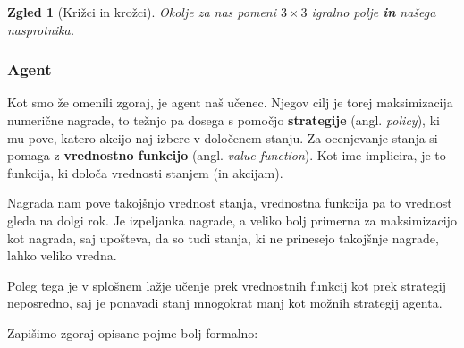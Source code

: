 \documentclass[12pt,a4paper]{amsart}
\theoremstyle{definition} %
\theoremstyle{plain} %
\newtheorem{zgled}[definicija]{Zgled}
\begin{document}
\begin{zgled}[Križci in krožci]
    Okolje za nas pomeni $3\times3$ igralno polje \textbf{in} našega nasprotnika.
\end{zgled}

\subsubsection{Agent}
Kot smo že omenili zgoraj, je agent naš učenec. Njegov cilj je torej maksimizacija numerične 
nagrade, to težnjo pa dosega s pomočjo \textbf{strategije} (angl. \textit{policy}), ki mu pove, 
katero akcijo naj izbere v določenem stanju. Za ocenjevanje stanja si pomaga z \textbf{vrednostno 
funkcijo} (angl. \textit{value function}). Kot ime implicira, je to funkcija, ki določa vrednosti 
stanjem (in akcijam). 

Nagrada nam pove takojšnjo vrednost stanja, vrednostna funkcija pa to vrednost gleda na dolgi
rok. Je izpeljanka nagrade, a veliko bolj primerna za maksimizacijo kot nagrada, saj upošteva,
da so tudi stanja, ki ne prinesejo takojšnje nagrade, lahko veliko vredna.

Poleg tega je v splošnem lažje učenje prek vrednostnih funkcij kot prek strategij neposredno, 
saj je ponavadi stanj mnogokrat manj kot možnih strategij agenta.

Zapišimo zgoraj opisane pojme bolj formalno:
\end{document}

